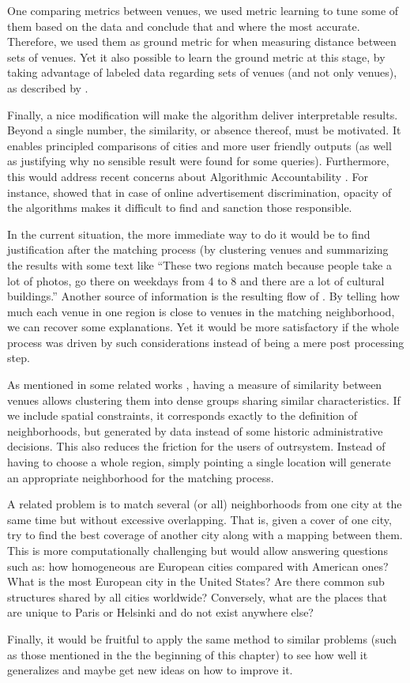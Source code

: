 One comparing metrics between venues, we used metric learning to tune some of
them based on the data and conclude that \eucl{} and \lmnn{} where the most
accurate. Therefore, we used them as ground metric for \emd{} when measuring
distance between sets of venues. Yet it also possible to learn the ground
metric at this stage, by taking advantage of labeled data regarding sets of
venues (and not only venues), as described by \textcite{LearnEMD14}.

Finally, a nice modification will make the algorithm deliver interpretable
results. Beyond a single number, the similarity, or absence thereof, must be
motivated. It enables principled comparisons of cities and more user friendly
outputs (as well as justifying why no sensible result were found for some
queries).  Furthermore, this would address recent concerns about Algorithmic
Accountability \autocite{Accountability13}. For instance,
\textcite{Discrimination13} showed that in case of online advertisement
discrimination, opacity of the algorithms makes it difficult to find and
sanction those responsible.

In the current situation, the more immediate way to do it would be to find
justification after the matching process (by clustering venues and summarizing
the results with some text like \enquote{These two regions match because people
take a lot of photos, go there on weekdays from 4\hpm{} to 8\hpm{} and there are a
lot of cultural buildings.} Another source of information is the resulting
flow of \emd{}. By telling how much each venue in one region is close to venues
in the matching neighborhood, we can recover some explanations.  Yet it would
be more satisfactory if the whole process was driven by such considerations
instead of being a mere post processing step.

\bigskip

As mentioned in some related works \autocites{Livehoods12}{Hoodsquare13},
having a measure of similarity between venues allows clustering them into
dense groups sharing similar characteristics. If we include spatial
constraints, it corresponds exactly to the definition of neighborhoods, but
generated by data instead of some historic administrative decisions. This
also reduces the friction for the users of outrsystem. Instead of having to
choose a whole region, simply pointing a single location will generate an
appropriate neighborhood for the matching process.

A related problem is to match several (or all) neighborhoods from one city at
the same time but without excessive overlapping. That is, given a cover of one
city, try to find the best coverage of another city along with a mapping
between them. This is more computationally challenging but would allow
answering questions such as: how homogeneous are European cities compared with
American ones? What is the most European city in the United States? Are there
common sub structures shared by all cities worldwide? Conversely, what are the
places that are unique to Paris or Helsinki and do not exist anywhere else?

Finally, it would be fruitful to apply the same method to similar problems
(such as those mentioned in the the beginning of this chapter) to see
how well it generalizes and maybe get new ideas on how to improve it.

\endgroup
